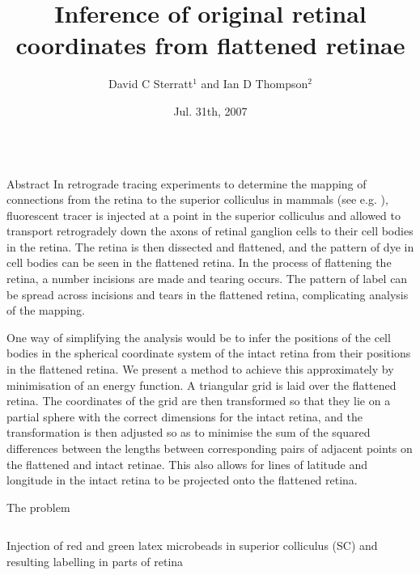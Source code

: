 \documentclass[final,hyperref={pdfpagelabels=false}]{beamer}
\title{Inference of original retinal coordinates from flattened
  retinae} \author{David C Sterratt$^1$ and Ian D Thompson$^2$}
\institute{$^1$Institute for Adaptive \& Neural Computation, School of
  Informatics, University of Edinburgh\\ $^2$MRC Centre for Developmental
  Neurobiology, King's College London} \date{Jul. 31th, 2007}
\begin{document}
\begin{frame}{} 
  \begin{columns}[T]

    \begin{column}{.33\linewidth}

      \begin{block}{Abstract}
        In retrograde tracing experiments to determine the mapping of
        connections from the retina to the superior colliculus in
        mammals (see e.g. \citealp{RashEtal05oppo}), fluorescent
        tracer is injected at a point in the superior colliculus and
        allowed to transport retrogradely down the axons of retinal
        ganglion cells to their cell bodies in the retina. The retina
        is then dissected and flattened, and the pattern of dye in
        cell bodies can be seen in the flattened retina. In the
        process of flattening the retina, a number incisions are made
        and tearing occurs. The pattern of label can be spread across
        incisions and tears in the flattened retina, complicating
        analysis of the mapping.

        One way of simplifying the analysis would be to infer the
        positions of the cell bodies in the spherical coordinate
        system of the intact retina from their positions in the
        flattened retina. We present a method to achieve this
        approximately by minimisation of an energy function. A
        triangular grid is laid over the flattened retina. The
        coordinates of the grid are then transformed so that they lie
        on a partial sphere with the correct dimensions for the intact
        retina, and the transformation is then adjusted so as to
        minimise the sum of the squared differences between the
        lengths between corresponding pairs of adjacent points on the
        flattened and intact retinae. This also allows for lines of
        latitude and longitude in the intact retina to be projected
        onto the flattened retina.
      \end{block}
      

      \begin{block}{The problem}

        \begin{columns}
          \begin{column}{0.25\linewidth}
            Injection of red and green latex microbeads in superior
            colliculus (SC) and resulting labelling in parts of retina


\end{column}
\end{columns}
\end{block}
\end{column}
\end{columns}
\end{frame}
\end{document}
